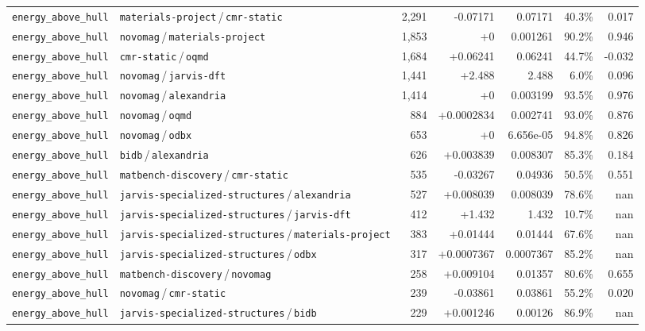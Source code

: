 \begin{longtable}{llrrrrr}
\texttt{energy\_above\_hull} & \texttt{materials-project}\,/\,\texttt{cmr-static} & 2{,}291 & -0.07171 & 0.07171 & 40.3\% & 0.017 \\
\texttt{energy\_above\_hull} & \texttt{novomag}\,/\,\texttt{materials-project} & 1{,}853 & +0 & 0.001261 & 90.2\% & 0.946 \\
\texttt{energy\_above\_hull} & \texttt{cmr-static}\,/\,\texttt{oqmd} & 1{,}684 & +0.06241 & 0.06241 & 44.7\% & -0.032 \\
\texttt{energy\_above\_hull} & \texttt{novomag}\,/\,\texttt{jarvis-dft} & 1{,}441 & +2.488 & 2.488 & 6.0\% & 0.096 \\
\texttt{energy\_above\_hull} & \texttt{novomag}\,/\,\texttt{alexandria} & 1{,}414 & +0 & 0.003199 & 93.5\% & 0.976 \\
\texttt{energy\_above\_hull} & \texttt{novomag}\,/\,\texttt{oqmd} & 884 & +0.0002834 & 0.002741 & 93.0\% & 0.876 \\
\texttt{energy\_above\_hull} & \texttt{novomag}\,/\,\texttt{odbx} & 653 & +0 & 6.656e-05 & 94.8\% & 0.826 \\
\texttt{energy\_above\_hull} & \texttt{bidb}\,/\,\texttt{alexandria} & 626 & +0.003839 & 0.008307 & 85.3\% & 0.184 \\
\texttt{energy\_above\_hull} & \texttt{matbench-discovery}\,/\,\texttt{cmr-static} & 535 & -0.03267 & 0.04936 & 50.5\% & 0.551 \\
\texttt{energy\_above\_hull} & \texttt{jarvis-specialized-structures}\,/\,\texttt{alexandria} & 527 & +0.008039 & 0.008039 & 78.6\% & nan \\
\texttt{energy\_above\_hull} & \texttt{jarvis-specialized-structures}\,/\,\texttt{jarvis-dft} & 412 & +1.432 & 1.432 & 10.7\% & nan \\
\texttt{energy\_above\_hull} & \texttt{jarvis-specialized-structures}\,/\,\texttt{materials-project} & 383 & +0.01444 & 0.01444 & 67.6\% & nan \\
\texttt{energy\_above\_hull} & \texttt{jarvis-specialized-structures}\,/\,\texttt{odbx} & 317 & +0.0007367 & 0.0007367 & 85.2\% & nan \\
\texttt{energy\_above\_hull} & \texttt{matbench-discovery}\,/\,\texttt{novomag} & 258 & +0.009104 & 0.01357 & 80.6\% & 0.655 \\
\texttt{energy\_above\_hull} & \texttt{novomag}\,/\,\texttt{cmr-static} & 239 & -0.03861 & 0.03861 & 55.2\% & 0.020 \\
\texttt{energy\_above\_hull} & \texttt{jarvis-specialized-structures}\,/\,\texttt{bidb} & 229 & +0.001246 & 0.00126 & 86.9\% & nan \\

\end{longtable}
